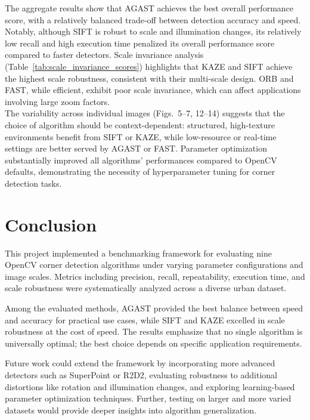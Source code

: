 \documentclass[journal]{IEEEtran}
\begin{document}
The aggregate results show that AGAST achieves the best overall performance score, with a relatively balanced trade-off between detection accuracy and speed. Notably, although SIFT is robust to scale and illumination changes, its relatively low recall and high execution time penalized its overall performance score compared to faster detectors.
Scale invariance analysis (Table~\ref{tab:scale_invariance_scores}) highlights that KAZE and SIFT achieve the highest scale robustness, consistent with their multi-scale design. ORB and FAST, while efficient, exhibit poor scale invariance, which can affect applications involving large zoom factors.\\

The variability across individual images (Figs.~5--7, 12--14) suggests that the choice of algorithm should be context-dependent: structured, high-texture environments benefit from SIFT or KAZE, while low-resource or real-time settings are better served by AGAST or FAST. Parameter optimization substantially improved all algorithms' performances compared to OpenCV defaults, demonstrating the necessity of hyperparameter tuning for corner detection tasks.\\


\section{Conclusion}
\label{section:conclusion}

This project implemented a benchmarking framework for evaluating nine OpenCV corner detection algorithms under varying parameter configurations and image scales. Metrics including precision, recall, repeatability, execution time, and scale robustness were systematically analyzed across a diverse urban dataset.

Among the evaluated methods, AGAST provided the best balance between speed and accuracy for practical use cases, while SIFT and KAZE excelled in scale robustness at the cost of speed. The results emphasize that no single algorithm is universally optimal; the best choice depends on specific application requirements.

Future work could extend the framework by incorporating more advanced detectors such as SuperPoint or R2D2, evaluating robustness to additional distortions like rotation and illumination changes, and exploring learning-based parameter optimization techniques. Further, testing on larger and more varied datasets would provide deeper insights into algorithm generalization.
\end{document}
